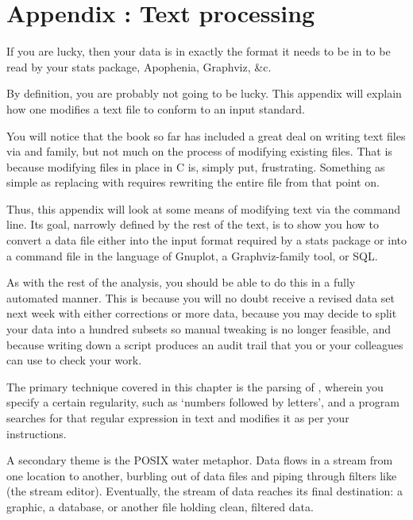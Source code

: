 \renewcommand\thechapter{\Alph{chapter}}
\setcounter{chapter}{1}
\setcounter{section}{0}
\setcounter{subsection}{0}
\setcounter{ex}{0}
\chapter{Appendix \thechapter: Text processing} \label{textappendix}

If you are lucky, then your data is in exactly the format it needs to be
in to be read by your stats package, Apophenia, Graphviz, \&c.

By definition, you are probably not going to be lucky. This appendix will
explain how one modifies a text file to conform to an input standard. 

You will notice that the book so far has included a great deal on writing
text files via  and family, but not much on the process of
modifying existing files. That is because modifying files in place in
C is, simply put, frustrating. Something as simple as replacing 
with  requires rewriting the entire file from that point on.

Thus, this appendix will look at some means of modifying text via the
command line. Its goal, narrowly defined by the rest of the text, is to
show you how to convert a data file either into the input format required
by a stats package or into a command file in the language of Gnuplot,
a Graphviz-family tool, or SQL.

As with the rest of the analysis, you should be able to do this in a
fully automated manner. This is because you will no doubt receive a
revised data set next week with either corrections or more data, because
you may decide to split your data into a hundred subsets so manual
tweaking is no longer feasible, and because writing down a script
produces an audit trail that you or your colleagues can use to check
your work.

The primary technique covered in this chapter is the parsing of
, wherein you specify a certain regularity,
such as `numbers followed by letters', and a program searches for that
regular expression in text and modifies it as per your instructions.

A secondary theme is the POSIX water metaphor. Data flows in a stream from
one location to another, burbling out of data files and piping through
filters like  (the stream editor).  Eventually, the stream of
data reaches its final destination: a graphic, a database, or another
file holding clean, filtered data.

